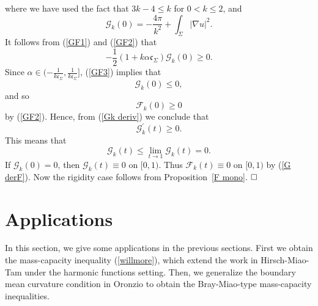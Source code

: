 \documentclass[12pt]{article}
\theoremstyle{definition}
\theoremstyle{plain}
\numberwithin{equation}{section}
\begin{document}
where we have used the fact that $ 3k-4\leq k $ for $ 0<k\leq 2 $, and 
$$
\mathcal{G}_{k}(0)=-\frac{4\pi}{k^{2}}+\int_{\Sigma}|\nabla u|^{2}.
$$
It follows from (\ref{GF1}) and (\ref{GF2}) that 
\begin{equation}\label{GF3}
-\frac{1}{2}(1+k\alpha \mathfrak{c}_{\Sigma})\mathcal{G}_{k}(0)\geq 0.
\end{equation}
Since $ \alpha\in (-\frac{1}{k\mathfrak{c}_{\Sigma}},\frac{1}{k\mathfrak{c}_{\Sigma}}]  $, (\ref{GF3}) implies that 
$$
\mathcal{G}_{k}(0)\leq 0,
$$
and so 
$$
\mathcal{F}_{k}(0)\geq 0
$$
by (\ref{GF2}). Hence, from (\ref{Gk deriv}) we conclude that 
$$
\mathcal{G}_{k}^{\prime}(t)\geq 0.
$$
This means that 
$$
\mathcal{G}_{k}(t)\leq \lim\limits_{t\to 1}\mathcal{G}_{k}(t)=0.
$$
If $ \mathcal{G}_{k}(0)=0$, then $ \mathcal{G}_{k}(t)\equiv0 $ on $ [0,1) $. Thus $ \mathcal{F}_{k}(t)\equiv0 $ on $ [0,1) $ by (\ref{G derF}). Now the rigidity case follows from Proposition~\ref{F mono}.
$\hfill\square$ 


\section{\bf Applications}
In this section, we give some applications in the previous sections. First we obtain the mass-capacity inequality (\ref{willmore}), which extend the work in Hirsch-Miao-Tam \cite{Hrisch1} under the harmonic functions setting. Then, we generalize the boundary mean curvature condition in Oronzio \cite{Oronzio} to obtain the Bray-Miao-type mass-capacity inequalities. 
\end{document}
